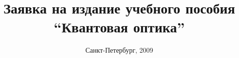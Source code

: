 \title{Заявка на издание учебного пособия \\ ``Квантовая оптика''}
\author{}
\date{Санкт-Петербург, 2009}
\maketitle
\newpage
